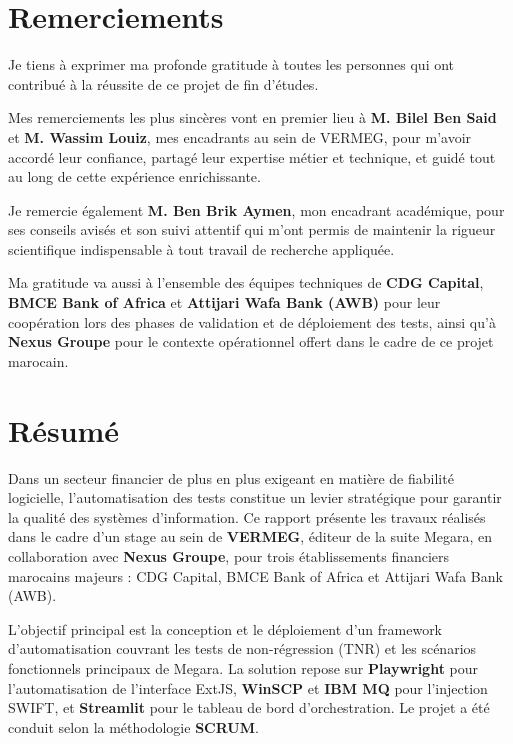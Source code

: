 \documentclass[12pt, a4paper]{report}
\begin{document}
\chapter*{Remerciements}

Je tiens à exprimer ma profonde gratitude à toutes les personnes qui ont contribué à la réussite de ce projet de fin d'études.

Mes remerciements les plus sincères vont en premier lieu à \textbf{M. Bilel Ben Said} et \textbf{M. Wassim Louiz}, mes encadrants au sein de VERMEG, pour m'avoir accordé leur confiance, partagé leur expertise métier et technique, et guidé tout au long de cette expérience enrichissante.

Je remercie également \textbf{M. Ben Brik Aymen}, mon encadrant académique, pour ses conseils avisés et son suivi attentif qui m'ont permis de maintenir la rigueur scientifique indispensable à tout travail de recherche appliquée.

Ma gratitude va aussi à l'ensemble des équipes techniques de \textbf{CDG Capital}, \textbf{BMCE Bank of Africa} et \textbf{Attijari Wafa Bank (AWB)} pour leur coopération lors des phases de validation et de déploiement des tests, ainsi qu'à \textbf{Nexus Groupe} pour le contexte opérationnel offert dans le cadre de ce projet marocain.

\newpage

\chapter*{Résumé}

Dans un secteur financier de plus en plus exigeant en matière de fiabilité logicielle, l'automatisation des tests constitue un levier stratégique pour garantir la qualité des systèmes d'information. Ce rapport présente les travaux réalisés dans le cadre d'un stage au sein de \textbf{VERMEG}, éditeur de la suite Megara, en collaboration avec \textbf{Nexus Groupe}, pour trois établissements financiers marocains majeurs : CDG Capital, BMCE Bank of Africa et Attijari Wafa Bank (AWB).

L'objectif principal est la conception et le déploiement d'un framework d'automatisation couvrant les tests de non-régression (TNR) et les scénarios fonctionnels principaux de Megara. La solution repose sur \textbf{Playwright} pour l'automatisation de l'interface ExtJS, \textbf{WinSCP} et \textbf{IBM MQ} pour l'injection SWIFT, et \textbf{Streamlit} pour le tableau de bord d'orchestration. Le projet a été conduit selon la méthodologie \textbf{SCRUM}.
\end{document}
